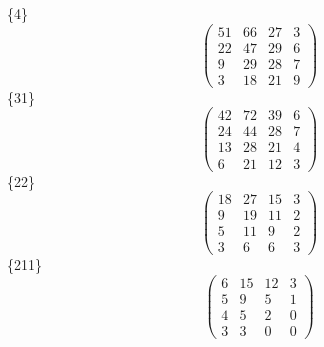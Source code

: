 \documentclass[12pt,reqno]{amsart}
\begin{document}
\Large
\{4\}                             $$ \begin{pmatrix} 
                         51 & 66 & 27 & 3 \\[6pt]
                         22 & 47 & 29 & 6 \\[6pt]
                          9 & 29 & 28 & 7 \\[6pt]
                            3 & 18 & 21 & 9
                              \end{pmatrix} $$ 
\{31\}                             $$ \begin{pmatrix} 
                         42 & 72 & 39 & 6 \\[6pt]
                         24 & 44 & 28 & 7 \\[6pt]
                         13 & 28 & 21 & 4 \\[6pt]
                            6 & 21 & 12 & 3
                              \end{pmatrix} $$ 
\{22\}                             $$ \begin{pmatrix} 
                         18 & 27 & 15 & 3 \\[6pt]
                          9 & 19 & 11 & 2 \\[6pt]
                          5 & 11 & 9 & 2 \\[6pt]
                             3 & 6 & 6 & 3
                              \end{pmatrix} $$ 
\{211\}                             $$ \begin{pmatrix} 
                          6 & 15 & 12 & 3 \\[6pt]
                           5 & 9 & 5 & 1 \\[6pt]
                           4 & 5 & 2 & 0 \\[6pt]
                             3 & 3 & 0 & 0
                              \end{pmatrix} $$ 
\end{document}
